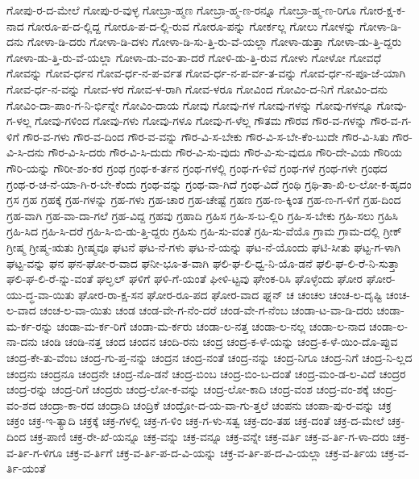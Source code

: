 {ಗೋಪು-ರ-ದ-ಮೇಲೆ
ಗೋಪು-ರ-ವುಳ್ಳ
ಗೋಬ್ರಾ-ಹ್ಮಣ
ಗೋಬ್ರಾ-ಹ್ಮ-ಣ-ರನ್ನೂ
ಗೋಬ್ರಾ-ಹ್ಮ-ಣ-ರಿಗೂ
ಗೋರ-ಕ್ಷ-ಕ-ನಾದ
ಗೋರೂ-ಪ-ದ-ಲ್ಲಿದ್ದ
ಗೋರೂ-ಪ-ದ-ಲ್ಲಿ-ರುವ
ಗೋರೂ-ಪನ್ನು
ಗೋರ್ಕಲ್ಲ
ಗೋಲು
ಗೋಳನ್ನು
ಗೋಳಾ-ಡಿ-ದನು
ಗೋಳಾ-ಡಿ-ದರು
ಗೋಳಾ-ಡಿ-ದಳು
ಗೋಳಾ-ಡಿ-ಸು-ತ್ತಿ-ರು-ವೆ-ಯಲ್ಲಾ
ಗೋಳಾ-ಡುತ್ತಾ
ಗೋಳಾ-ಡು-ತ್ತಿ-ದ್ದರು
ಗೋಳಾ-ಡು-ತ್ತಿ-ರು-ವೆ-ಯಲ್ಲಾ
ಗೋಳಾ-ಡು-ವಂ-ತಾ-ದರೆ
ಗೋಳಿ-ಡು-ತ್ತಿ-ರುವ
ಗೋಳು
ಗೋಳೋ
ಗೋವಧೆ
ಗೋವನ್ನು
ಗೋವ-ರ್ಧನ
ಗೋವ-ರ್ಧ-ನ-ಪ-ರ್ವತ
ಗೋವ-ರ್ಧ-ನ-ಪ-ರ್ವ-ತ-ವನ್ನು
ಗೋವ-ರ್ಧ-ನ-ಪೂ-ಜೆ-ಯಾಗಿ
ಗೋವ-ರ್ಧ-ನ-ವನ್ನು
ಗೋವ-ಳರ
ಗೋವ-ಳ-ರಾಗಿ
ಗೋವ-ಳರೂ
ಗೋವಿಂದ
ಗೋವಿಂ-ದ-ನಿಗೆ
ಗೋವಿಂ-ದನು
ಗೋವಿಂ-ದಾ-ಪಾಂ-ಗ-ನಿ-ರ್ಭಿನ್ನೇ
ಗೋವಿಂ-ದಾಯ
ಗೋವು
ಗೋವು-ಗಳ
ಗೋವು-ಗಳನ್ನು
ಗೋವು-ಗಳನ್ನೂ
ಗೋವು-ಗ-ಳಲ್ಲ
ಗೋವು-ಗಳಿಂದ
ಗೋವು-ಗಳು
ಗೋವು-ಗಳೂ
ಗೋವು-ಗ-ಳೆಲ್ಲ
ಗೌತಮ
ಗೌರವ
ಗೌರ-ವ-ಗಳನ್ನು
ಗೌರ-ವ-ಗ-ಳಿಗೆ
ಗೌರ-ವ-ಗಳು
ಗೌರ-ವ-ದಿಂದ
ಗೌರ-ವ-ವನ್ನು
ಗೌರ-ವಿ-ಸ-ಬೇಕು
ಗೌರ-ವಿ-ಸ-ಬೇ-ಕೆಂ-ಬುದೇ
ಗೌರ-ವಿ-ಸಿತು
ಗೌರ-ವಿ-ಸಿ-ದನು
ಗೌರ-ವಿ-ಸಿ-ದರು
ಗೌರ-ವಿ-ಸಿ-ದುದು
ಗೌರ-ವಿ-ಸು-ವುದು
ಗೌರ-ವಿ-ಸು-ವುದೂ
ಗೌರಿ-ದೇ-ವಿಯ
ಗೌರಿಯ
ಗೌರಿ-ಯನ್ನು
ಗೌರೀ-ಶಂ-ಕರ
ಗ್ರಂಥ
ಗ್ರಂಥ-ಕ-ರ್ತನ
ಗ್ರಂಥ-ಗಳಲ್ಲಿ
ಗ್ರಂಥ-ಗ-ಳಿವೆ
ಗ್ರಂಥ-ಗಳೆ
ಗ್ರಂಥ-ಗಳೇ
ಗ್ರಂಥದ
ಗ್ರಂಥ-ರ-ಚ-ನೆ-ಯಾ-ಗಿ-ರ-ಬೇ-ಕೆಂದು
ಗ್ರಂಥ-ವನ್ನು
ಗ್ರಂಥ-ವಾ-ಗಿದೆ
ಗ್ರಂಥ-ವಿದೆ
ಗ್ರಂಥಿ
ಗ್ರಥಿ-ತಾ-ಖಿ-ಲ-ಲೋ-ಕ-ಹೃದಂ
ಗ್ರಸ
ಗ್ರಹ
ಗ್ರಹಕ್ಕೆ
ಗ್ರಹ-ಗಳನ್ನು
ಗ್ರಹ-ಗಳು
ಗ್ರಹ-ಚಾರ
ಗ್ರಹ-ಚೇಷ್ಟೆ
ಗ್ರಹಣ
ಗ್ರಹ-ಣ-ಕ್ಕಿಂತ
ಗ್ರಹ-ಣ-ಗ-ಳಿಗೆ
ಗ್ರಹ-ದಿಂದ
ಗ್ರಹ-ವಾಗಿ
ಗ್ರಹ-ವಾ-ದಾ-ಗಲೆ
ಗ್ರಹ-ವಿದ್ದ
ಗ್ರಹವು
ಗ್ರಹಾದಿ
ಗ್ರಹಿಸ
ಗ್ರಹಿ-ಸ-ಬ-ಲ್ಲಿರಿ
ಗ್ರಹಿ-ಸ-ಬೇಕು
ಗ್ರಹಿ-ಸಲು
ಗ್ರಹಿಸಿ
ಗ್ರಹಿ-ಸಿದ
ಗ್ರಹಿ-ಸಿ-ದರೆ
ಗ್ರಹಿ-ಸಿ-ಬಿ-ಡು-ತ್ತಿ-ದ್ದರು
ಗ್ರಹಿಸು
ಗ್ರಹಿ-ಸು-ವಂತೆ
ಗ್ರಹಿ-ಸು-ವೆಯೊ
ಗ್ರಾಮ
ಗ್ರಾಮ-ದಲ್ಲಿ
ಗ್ರೀಕ್
ಗ್ರೀಷ್ಮ
ಗ್ರೀಷ್ಮ-ಋತು
ಗ್ರೀಷ್ಮವೂ
ಘಟನೆ
ಘಟ-ನೆ-ಗಳು
ಘಟ-ನೆ-ಯನ್ನು
ಘಟ-ನೆ-ಯೊಂದು
ಘಟಿ-ಸೀತು
ಘಟ್ಟ-ಗ-ಳಾಗಿ
ಘಟ್ಟ-ವನ್ನು
ಘನ
ಘನ-ಘೋ-ರ-ವಾದ
ಘನೀ-ಭೂ-ತ-ವಾಗಿ
ಘಲಿ-ಘ-ಲಿ-ಧ್ವ-ನಿ-ಯೊ-ಡನೆ
ಘಲಿ-ಘ-ಲಿ-ರೆ-ನಿ-ಸುತ್ತಾ
ಘಲಿ-ಘ-ಲಿ-ರೆ-ನ್ನು-ವಂತೆ
ಘಲ್ಘಲ್
ಘಳಿಗೆ
ಘಳಿ-ಗೆ-ಯಂತೆ
ಘೀಳಿ-ಟ್ಟವು
ಘೇಂಕ-ರಿಸಿ
ಘೊಳ್ಳೆಂದು
ಘೋರ
ಘೋರ-ಯು-ದ್ಧ-ವಾ-ಯಿತು
ಘೋರ-ರಾ-ಕ್ಷ-ಸನ
ಘೋರ-ರೂ-ಪದ
ಘೋರ-ವಾದ
ಘ್ನನ್
ಚ
ಚಂಚಲ
ಚಂಚ-ಲ-ದೃಷ್ಟಿ
ಚಂಚ-ಲ-ವಾದ
ಚಂಚ-ಲ-ವಾ-ಯಿತು
ಚಂಡ
ಚಂಡ-ವೇ-ಗ-ನೆಂ-ದರೆ
ಚಂಡ-ವೇ-ಗ-ನೆಂಬ
ಚಂಡಾ-ಟ-ವಾ-ಡಿ-ದರು
ಚಂಡಾ-ಮ-ರ್ಕ-ರನ್ನು
ಚಂಡಾ-ಮ-ರ್ಕ-ರಿಗೆ
ಚಂಡಾ-ಮ-ರ್ಕರು
ಚಂಡಾ-ಲ-ನತ್ತ
ಚಂಡಾ-ಲ-ನಲ್ಲ
ಚಂಡಾ-ಲ-ನಾದ
ಚಂಡಾ-ಲ-ನಾ-ದನು
ಚಂಡಿ
ಚಂಡಿ-ನತ್ತ
ಚಂದ
ಚಂದನ
ಚಂದಿ-ರನು
ಚಂದ್ರ
ಚಂದ್ರ-ಕ-ಳೆ-ಯನ್ನು
ಚಂದ್ರ-ಕ-ಳೆ-ಯಿಂ-ದೊ-ಪ್ಪುವ
ಚಂದ್ರ-ಕೇ-ತು-ವೆಂಬ
ಚಂದ್ರ-ಗು-ಪ್ತ-ನನ್ನು
ಚಂದ್ರನ
ಚಂದ್ರ-ನಂತೆ
ಚಂದ್ರ-ನನ್ನು
ಚಂದ್ರ-ನಿಗೂ
ಚಂದ್ರ-ನಿಗೆ
ಚಂದ್ರ-ನಿ-ಲ್ಲದ
ಚಂದ್ರನು
ಚಂದ್ರನೂ
ಚಂದ್ರನೇ
ಚಂದ್ರ-ನೊ-ಡನೆ
ಚಂದ್ರ-ಬಿಂಬ
ಚಂದ್ರ-ಬಿಂ-ಬ-ದಂತೆ
ಚಂದ್ರ-ಮಂ-ಡ-ಲ-ವಿದೆ
ಚಂದ್ರರ
ಚಂದ್ರ-ರನ್ನು
ಚಂದ್ರ-ರಿಗೆ
ಚಂದ್ರರು
ಚಂದ್ರ-ಲೋ-ಕ-ವನ್ನು
ಚಂದ್ರ-ಲೋ-ಕಾದಿ
ಚಂದ್ರ-ವಂಶ
ಚಂದ್ರ-ವಂ-ಶಕ್ಕೆ
ಚಂದ್ರ-ವಂ-ಶದ
ಚಂದ್ರಾ-ಕಾ-ರದ
ಚಂದ್ರಾದಿ
ಚಂದ್ರಿಕೆ
ಚಂದ್ರೋ-ದ-ಯ-ವಾ-ಗು-ತ್ತಲೆ
ಚಂಪನು
ಚಂಪಾ-ಪು-ರ-ವನ್ನು
ಚಕ್ರ
ಚಕ್ರಂ
ಚಕ್ರ-ಇ-ತ್ಯಾದಿ
ಚಕ್ರಕ್ಕೆ
ಚಕ್ರ-ಗಳಲ್ಲಿ
ಚಕ್ರ-ಗ-ಳಿಂ
ಚಕ್ರ-ಗ-ಳು-ಸತ್ವ
ಚಕ್ರ-ದಂ-ತಹ
ಚಕ್ರ-ದಂತೆ
ಚಕ್ರ-ದ-ಮೇಲೆ
ಚಕ್ರ-ದಿಂದ
ಚಕ್ರ-ಪಾಣಿ
ಚಕ್ರ-ರೇ-ಖೆ-ಯನ್ನೂ
ಚಕ್ರ-ವನ್ನು
ಚಕ್ರ-ವನ್ನೂ
ಚಕ್ರ-ವನ್ನೇ
ಚಕ್ರ-ವರ್ತಿ
ಚಕ್ರ-ವ-ರ್ತಿ-ಗ-ಳಾ-ದರು
ಚಕ್ರ-ವ-ರ್ತಿ-ಗ-ಳಿಗೂ
ಚಕ್ರ-ವ-ರ್ತಿಗೆ
ಚಕ್ರ-ವ-ರ್ತಿ-ಪ-ದ-ವಿ-ಯನ್ನು
ಚಕ್ರ-ವ-ರ್ತಿ-ಪ-ದ-ವಿ-ಯಲ್ಲಾ
ಚಕ್ರ-ವ-ರ್ತಿಯ
ಚಕ್ರ-ವ-ರ್ತಿ-ಯಂತೆ
}

